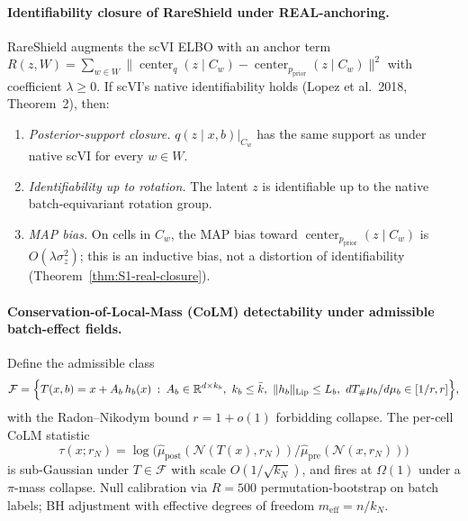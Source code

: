 
\paragraph{Identifiability closure of RareShield under REAL-anchoring.}
RareShield augments the scVI ELBO with an anchor term $R(z,W) = \sum_{w\in W}\|\operatorname{center}_{q}(z\mid C_{w}) - \operatorname{center}_{p_{\mathrm{prior}}}(z\mid C_{w})\|^{2}$ with coefficient $\lambda\geq 0$. If scVI's native identifiability holds (Lopez et al.\ 2018, Theorem~2), then:
\begin{enumerate}[leftmargin=*,nosep]
  \item \emph{Posterior-support closure.} $q(z\mid x,b)\big|_{C_{w}}$ has the same support as under native scVI for every $w\in W$.
  \item \emph{Identifiability up to rotation.} The latent $z$ is identifiable up to the native batch-equivariant rotation group.
  \item \emph{MAP bias.} On cells in $C_{w}$, the MAP bias toward $\operatorname{center}_{p_{\mathrm{prior}}}(z\mid C_{w})$ is $O(\lambda\sigma_{z}^{2})$; this is an inductive bias, not a distortion of identifiability (Theorem~\ref{thm:S1-real-closure}).
\end{enumerate}

\paragraph{Conservation-of-Local-Mass (CoLM) detectability under admissible batch-effect fields.}
Define the admissible class
\[
  \mathcal{F} = \Bigl\{T(x,b) = x + A_{b}\,h_{b}(x) \::\: A_{b}\in\mathbb{R}^{d\times k_{b}},\ k_{b}\leq \bar k,\ \|h_{b}\|_{\mathrm{Lip}}\leq L_{b},\ dT_{\#}\mu_{b}/d\mu_{b}\in[1/r,r]\Bigr\},
\]
with the Radon--Nikodym bound $r=1+o(1)$ forbidding collapse. The per-cell CoLM statistic
\[
  \tau(x; r_{N}) = \log\bigl(\widehat{\mu}_{\mathrm{post}}(\mathcal{N}(T(x), r_{N}))\big/\widehat{\mu}_{\mathrm{pre}}(\mathcal{N}(x, r_{N}))\bigr)
\]
is sub-Gaussian under $T\in\mathcal{F}$ with scale $O(1/\sqrt{k_{N}})$, and fires at $\Omega(1)$ under a $\pi$-mass collapse. Null calibration via $R{=}500$ permutation-bootstrap on batch labels; BH adjustment with effective degrees of freedom $m_{\mathrm{eff}}=n/k_{N}$.

